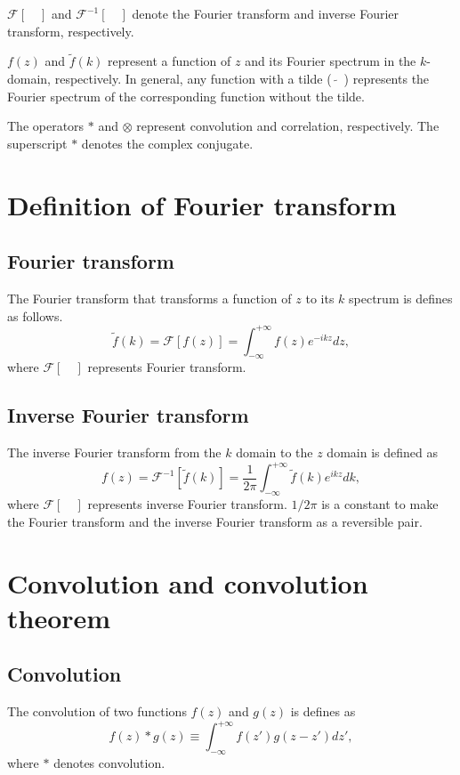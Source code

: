 \documentclass[a4paper]{article}
\newcommand{\ftf}[1]{{\mathcal{F}\left[#1\right]\xspace}}
\newcommand{\iftf}[1]{{\mathcal{F}^{-1}\left[#1\right]\xspace}}
\newcommand{\ftt}[1]{{\tilde{#1}\xspace}}
\begin{document}
$\ftf{\quad}$ and $\iftf{\quad}$ denote the Fourier transform and inverse Fourier transform, respectively.

$f(z)$ and $\ftt{f}(k)$ represent a function of $z$ and its Fourier spectrum in the $k$-domain, respectively.
In general, any function with a tilde ($\tilde{\quad}$) represents the Fourier spectrum of the corresponding function without the tilde.

The operators $*$ and $\otimes$ represent convolution and correlation, respectively.
The superscript $*$ denotes the complex conjugate.

\section{Definition of Fourier transform}
\subsection*{Fourier transform}
The Fourier transform that transforms a function of $z$ to its $k$ spectrum is defines as
follows.
\begin{equation}
	\ftt{f}(k) = \ftf{f(z)} = \int^{+\infty}_{-\infty} f(z) e^{-ikz}dz,
\end{equation}
where $\ftf{\quad}$ represents Fourier transform.

\subsection*{Inverse Fourier transform}
The inverse Fourier transform from the $k$ domain to the $z$ domain is defined as
\begin{equation}
	{f}(z) = \iftf{\ftt{f}(k)} = \frac{1}{2\pi} \int^{+\infty}_{-\infty} \ftt{f}(k) e^{ikz}dk,
\end{equation}
where $\ftf{\quad}$ represents inverse Fourier transform.
$1/2 \pi$ is a constant to make the Fourier transform and the inverse Fourier transform as a reversible pair.

\section{Convolution and convolution theorem}
\subsection*{Convolution}
The convolution of two functions $f(z)$ and $g(z)$ is defines as
\begin{equation}
	f(z)*g(z) \equiv \int_{-\infty}^{+\infty} f\left(z'\right)g\left(z-z'\right	)dz',
\end{equation}
where $*$ denotes convolution.
\end{document}
